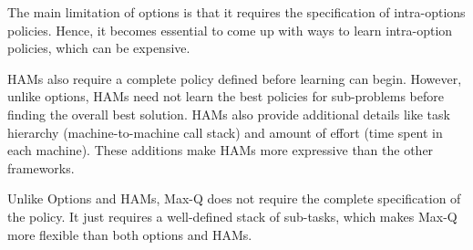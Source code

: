The main limitation of options is that it requires the specification of intra-options policies.
Hence, it becomes essential to come up with ways to learn intra-option policies, which can be expensive.

HAMs also require a complete policy defined before learning can begin.
However, unlike options, HAMs need not learn the best policies for sub-problems before finding the overall best solution.
HAMs also provide additional details like task hierarchy (machine-to-machine call stack) and amount of effort (time spent in each machine).
These additions make HAMs more expressive than the other frameworks.

Unlike Options and HAMs, Max-Q does not require the complete specification of the policy.
It just requires a well-defined stack of sub-tasks, which makes Max-Q more flexible than both
options and HAMs.
